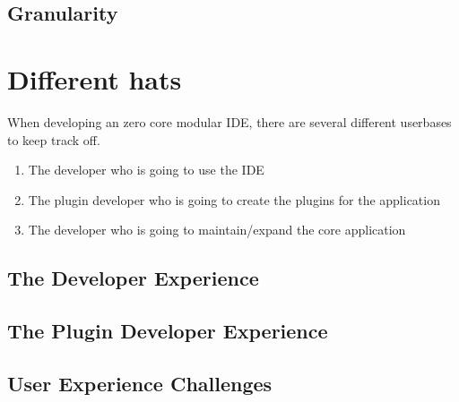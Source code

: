 \documentclass[runningheads]{llncs}
\begin{document}
\subsection{Granularity}

\section{Different hats}
When developing an zero core modular IDE, there are several different userbases
to keep track off.

\begin{enumerate}
  \item The developer who is going to use the IDE
  \item The plugin developer who is going to create the plugins for the application
  \item The developer who is going to maintain/expand the core application
\end{enumerate}

\subsection{The Developer Experience}
\subsection{The Plugin Developer Experience}
\subsection{User Experience Challenges}
\end{document}
